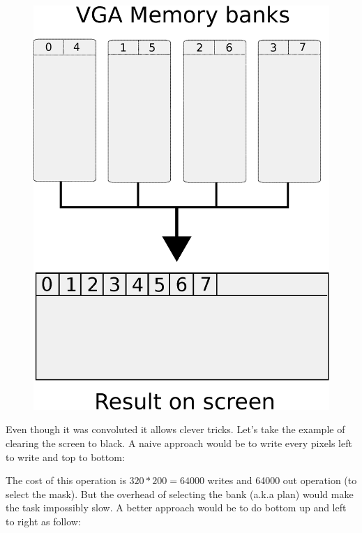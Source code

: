 \documentclass[book.tex]{subfiles}
\begin{document}
\begin{figure}[H]
\centering
\includegraphics[width=\textwidth]{imgs/vga_ram_screen_layout.eps}
\end{figure}

Even though it was convoluted it allows clever tricks. Let's take the example of clearing the screen to black. A naive approach would be to write every pixels left to write and top to bottom:\\
\par
\begin{minipage}{\textwidth}

\end{minipage}

The cost of this operation is $320*200=64000$ writes and 64000 out operation (to select the mask).
But the overhead of selecting the bank (a.k.a plan) would make the task impossibly slow. A better approach would be to do bottom up and left to right as follow:\\
\par
\begin{minipage}{\textwidth}

\end{minipage}
\end{document}
